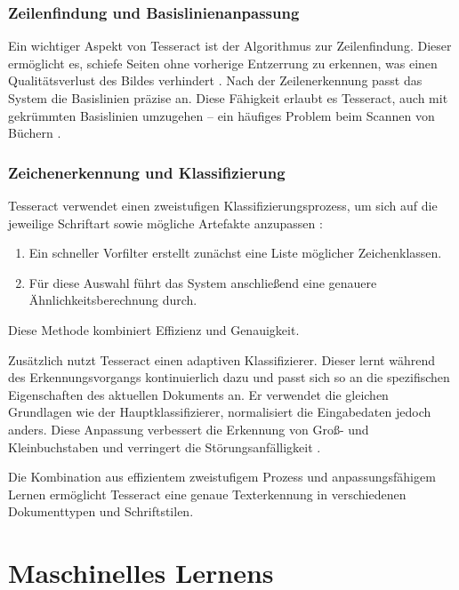\subsubsection{Zeilenfindung und Basislinienanpassung}
\label{subsubsec:zeilenfindung-und-basislinienanpassung}

Ein wichtiger Aspekt von Tesseract ist der Algorithmus zur Zeilenfindung. Dieser ermöglicht es, schiefe Seiten ohne vorherige Entzerrung zu erkennen, was einen Qualitätsverlust des Bildes verhindert \parencite{SmithR_2007_AOot}. Nach der Zeilenerkennung passt das System die Basislinien präzise an. Diese Fähigkeit erlaubt es Tesseract, auch mit gekrümmten Basislinien umzugehen – ein häufiges Problem beim Scannen von Büchern \parencite{SmithR_2007_AOot}.

\subsubsection{Zeichenerkennung und Klassifizierung}
\label{subsubsec:zeichenerkennung-und-klassifizierung}

Tesseract verwendet einen zweistufigen Klassifizierungsprozess, um sich auf die jeweilige Schriftart sowie mögliche Artefakte anzupassen \parencite{SmithR_2007_AOot}:

\begin{enumerate}
	\item Ein schneller Vorfilter erstellt zunächst eine Liste möglicher Zeichenklassen.
	\item Für diese Auswahl führt das System anschließend eine genauere Ähnlichkeitsberechnung durch.
\end{enumerate}

Diese Methode kombiniert Effizienz und Genauigkeit. 

Zusätzlich nutzt Tesseract einen adaptiven Klassifizierer. Dieser lernt während des Erkennungsvorgangs kontinuierlich dazu und passt sich so an die spezifischen Eigenschaften des aktuellen Dokuments an. Er verwendet die gleichen Grundlagen wie der Hauptklassifizierer, normalisiert die Eingabedaten jedoch anders. Diese Anpassung verbessert die Erkennung von Groß- und Kleinbuchstaben und verringert die Störungsanfälligkeit \parencite{SmithR_2007_AOot}.

Die Kombination aus effizientem zweistufigem Prozess und anpassungsfähigem Lernen ermöglicht Tesseract eine genaue Texterkennung in verschiedenen Dokumenttypen und Schriftstilen.

\section{Maschinelles Lernens}
\label{sec:grundlagen-des-maschinellen-lernens}

